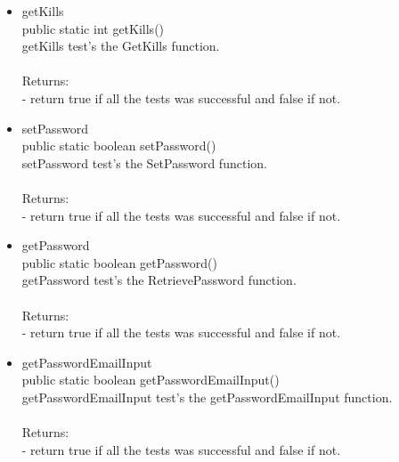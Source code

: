 \documentclass[letterpaper]{article}
\begin{document}
\begin{itemize}
\begin{itemize}
													\item	getKills \\
													  public static int getKills() \\
		
													getKills test's the GetKills function. \\ \\
													Returns: \\
													- return true if all the tests was successful and false if not.
													
													\item	setPassword \\
													 public static boolean setPassword() \\
		
													setPassword test's the SetPassword function. \\ \\
													Returns: \\
													- return true if all the tests was successful and false if not.
													
													\item	getPassword \\
													public static boolean getPassword() \\
		
													 getPassword test's the RetrievePassword function. \\ \\
													Returns: \\
													- return true if all the tests was successful and false if not.
													
													\item	getPasswordEmailInput \\
													 public static boolean getPasswordEmailInput() \\
		
													getPasswordEmailInput test's the getPasswordEmailInput function. \\ \\
													Returns: \\
													- return true if all the tests was successful and false if not.
													
													
										\end{itemize}
							\end{itemize}
				
				\vspace{0.2in}
	\newpage
		
		
\end{document}
